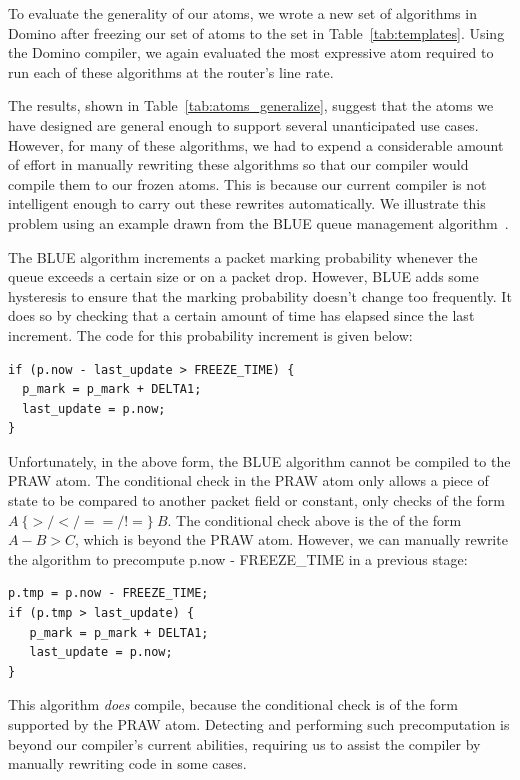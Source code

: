 To evaluate the generality of our atoms, we wrote a new set of algorithms in
Domino after freezing our set of atoms to the set in
Table~\ref{tab:templates}. Using the Domino compiler, we again evaluated the
most expressive atom required to run each of these algorithms at the router's
line rate.

The results, shown in Table~\ref{tab:atoms_generalize}, suggest that the atoms
we have designed are general enough to support several unanticipated use cases.
However, for many of these algorithms, we had to expend a considerable amount
of effort in manually rewriting these algorithms so that our compiler would
compile them to our frozen atoms. This is because our current compiler is not
intelligent enough to carry out these rewrites automatically. We illustrate
this problem using an example drawn from the BLUE queue management
algorithm~\cite{blue}.

The BLUE algorithm increments a packet marking probability whenever the queue
exceeds a certain size or on a packet drop. However, BLUE adds some hysteresis
to ensure that the marking probability doesn't change too frequently. It does
so by checking that a certain amount of time has elapsed since the last
increment.  The code for this probability increment is given below:

\begin{verbatim}
if (p.now - last_update > FREEZE_TIME) {
  p_mark = p_mark + DELTA1;
  last_update = p.now;
}
\end{verbatim}

Unfortunately, in the above form, the BLUE algorithm cannot be compiled to the
PRAW atom. The conditional check in the PRAW atom only allows a piece of state
to be compared to another packet field or constant, \ie only checks of the form
$A \ \{>/</==/!=\} \ B$. The conditional check above is the of the form $A - B
> C$, which is beyond the PRAW atom. However, we can manually rewrite the
algorithm to precompute p.now - FREEZE\_TIME in a previous stage:

\begin{verbatim}
p.tmp = p.now - FREEZE_TIME;
if (p.tmp > last_update) {
   p_mark = p_mark + DELTA1;
   last_update = p.now;
}
\end{verbatim}

This algorithm {\em does} compile, because the conditional check is of the form
supported by the PRAW atom. Detecting and performing such precomputation is
beyond our compiler's current abilities, requiring us to assist the compiler by
manually rewriting code in some cases. 

